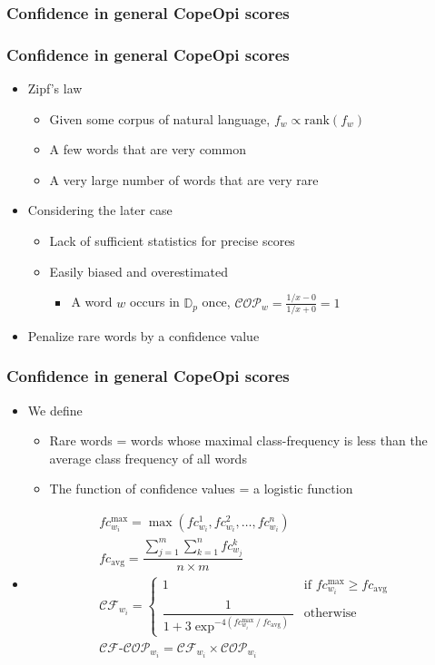 \documentclass[mathserif]{beamer}
\DeclareMathOperator*{\divby}{/}
\DeclareMathOperator*{\maxi}{max}
\DeclareMathOperator*{\avg}{avg}
\begin{document}
\subsubsection{Confidence in general CopeOpi scores}
\begin{frame}
\frametitle{Confidence in general CopeOpi scores}
\begin{itemize}
\item Zipf's law
	\begin{itemize}
	\item Given some corpus of natural language, $f_w \propto \mathrm{rank}(f_w)$
	\item A few words that are very common
	\item A very large number of words that are very rare
	\end{itemize}
\item Considering the later case
	\begin{itemize}
	\item Lack of sufficient statistics for precise scores
	\item Easily biased and overestimated
		\begin{itemize}
		\item A word $w$ occurs in $\mathbb{D}_p$ once, $\mathcal{COP}_{w}=\frac{1/x-0}{1/x+0}=1$
		\end{itemize}
	\end{itemize}
\item Penalize rare words by a confidence value
\end{itemize}
\end{frame}
\begin{frame}
\frametitle{Confidence in general CopeOpi scores}
\begin{itemize}
\item We define
\begin{itemize}
\item Rare words = words whose maximal class-frequency is less than the average class frequency of all words
\item The function of confidence values = a logistic function 
\end{itemize}
\item[] \vspace{-5ex}\begin{equation*}
\begin{gathered}
fc^{\maxi}_{w_i} = \maxi(fc^1_{w_i},fc^2_{w_i},\dots,fc^n_{w_i})
\\
fc_{\avg} = \dfrac {
	\sum_{j=1}^m \sum_{k=1}^n fc^k_{w_j}
}{
	n \times m
}
\\
\mathcal{CF}_{w_i} =
\begin{cases}
	1
	&\text{if $fc^{\maxi}_{w_i} \geq fc_{\avg}$}
\\
	\dfrac{1}{1 + 3 \exp^{-4(fc^{\maxi}_{w_i} \divby fc_{\avg})}}
	&\text{otherwise}
\end{cases}
\\
\mathcal{CF}\text{-}\mathcal{COP}_{w_i} = \mathcal{CF}_{w_i} \times \mathcal{COP}_{w_i}
\end{gathered}
\end{equation*}
\end{itemize}
\end{frame}
\end{document}
